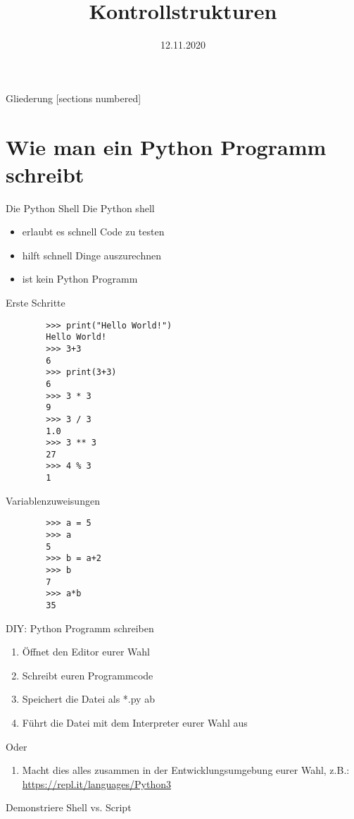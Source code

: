 



\title{Kontrollstrukturen}
\date{12.11.2020}



\maketitle

\begin{frame}{Gliederung}
    [sections numbered]
    \tableofcontents
\end{frame}

\section{Wie man ein Python Programm schreibt}
\begin{frame}{Die Python Shell}
	Die Python shell
	\begin{itemize}
		\item erlaubt es schnell Code zu testen
		\item hilft schnell Dinge auszurechnen
		\item ist kein Python Programm
	\end{itemize}
\end{frame}

\begin{frame}[fragile]{Erste Schritte}
	\begin{lstlisting}
		>>> print("Hello World!")
		Hello World!
		>>> 3+3
		6
		>>> print(3+3)
		6
		>>> 3 * 3
		9
		>>> 3 / 3 
		1.0
		>>> 3 ** 3
		27
		>>> 4 % 3
		1
	\end{lstlisting}
\end{frame}

\begin{frame}[fragile]{Variablenzuweisungen}
	\begin{lstlisting}
		>>> a = 5
		>>> a
		5
		>>> b = a+2
		>>> b
		7
		>>> a*b
		35	
	\end{lstlisting}
\end{frame}

\begin{frame}{DIY: Python Programm schreiben}
	\begin{enumerate}
		\item Öffnet den Editor eurer Wahl
		\item Schreibt euren Programmcode
		\item Speichert die Datei als *.py ab
		\item Führt die Datei mit dem Interpreter eurer Wahl aus
	\end{enumerate}
	Oder
	\begin{enumerate}
		\item Macht dies alles zusammen in der Entwicklungsumgebung eurer Wahl, z.B.: \url{https://repl.it/languages/Python3}
	\end{enumerate}
	\pause Demonstriere Shell vs. Script
\end{frame}

